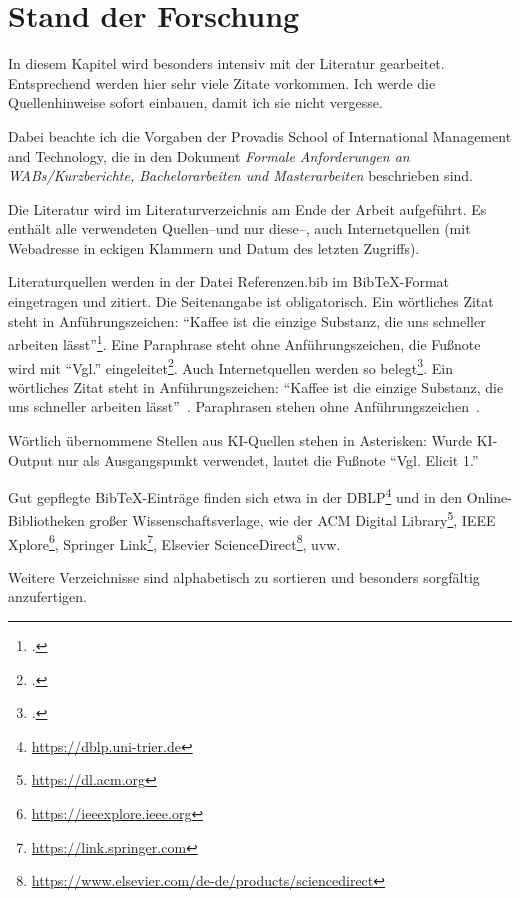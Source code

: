 %

\chapter{Stand der Forschung}

In diesem Kapitel wird besonders intensiv mit der Literatur gearbeitet. Entsprechend werden hier sehr viele Zitate vorkommen. Ich werde die Quellenhinweise sofort einbauen, damit ich sie nicht vergesse.

Dabei beachte ich die Vorgaben der Provadis School of International Management and Technology, die in den Dokument \emph{Formale Anforderungen an WABs/Kurzberichte, Bachelorarbeiten und Masterarbeiten} beschrieben sind.

Die Literatur wird im Literaturverzeichnis am Ende der Arbeit aufgeführt. Es enthält alle verwendeten Quellen--und nur diese--, auch Internetquellen (mit Webadresse in eckigen Klammern und Datum des letzten Zugriffs).

Literaturquellen werden in der Datei Referenzen.bib im BibTeX-Format eingetragen und zitiert. Die Seitenangabe ist obligatorisch.
\ifharvard
    Ein wörtliches Zitat steht in Anführungszeichen: \enquote{Kaffee ist die einzige Substanz, die uns schneller arbeiten lässt}\footcite[12]{lustigeCitation}. Eine Paraphrase steht ohne Anführungszeichen, die Fußnote wird mit \enquote{Vgl.} eingeleitet\footcite[Vgl.][8\psq]{mustermann2020}. Auch Internetquellen werden so belegt\footcite[Vgl.][]{provadisWeb}.
\else
    Ein wörtliches Zitat steht in Anführungszeichen: \enquote{Kaffee ist die einzige Substanz, die uns schneller arbeiten lässt}~\cite[12]{lustigeCitation}. Paraphrasen stehen ohne Anführungszeichen~\cite[8\psq]{mustermann2020}.
\fi

Wörtlich übernommene Stellen aus KI-Quellen stehen in Asterisken:  Wurde KI-Output nur als Ausgangspunkt verwendet, lautet die Fußnote \enquote{Vgl. Elicit 1.}

Gut gepflegte BibTeX-Einträge finden sich etwa in der DBLP\footnote{\url{https://dblp.uni-trier.de}} und in den Online-Bibliotheken großer Wissenschaftsverlage, wie der ACM Digital Library\footnote{\url{https://dl.acm.org}}, IEEE Xplore\footnote{\url{https://ieeexplore.ieee.org}}, Springer Link\footnote{\url{https://link.springer.com}}, Elsevier ScienceDirect\footnote{\url{https://www.elsevier.com/de-de/products/sciencedirect}}, uvw.

Weitere Verzeichnisse sind alphabetisch zu sortieren und besonders sorgfältig anzufertigen.
